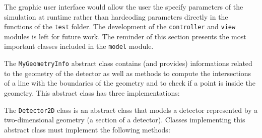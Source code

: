 \documentclass[11pt]{article}
\begin{document}
The graphic user interface would allow the user the specify
parameters of the simulation at runtime rather than hardcoding parameters
directly in the functions of the \texttt{test} folder.
The development of the \texttt{controller} and \texttt{view} modules
is left for future work. The reminder of this section presents the most important classes
included in the \texttt{model} module.

The \texttt{MyGeometryInfo} abstract class contains (and provides) informations
related to the
geometry of the detector as well as methods to compute the intersections of a
line with the boundaries of the geometry and to check if a point is inside
the geometry. This abstract class has three implementations:





The \texttt{Detector2D} class is an abstract class that models a detector
represented by a two-dimensional geometry (a section of a detector). Classes
implementing this abstract class must implement the following methods:
%
%
%
%
%
%
%
%
%
%
%
%
%
\end{document}
